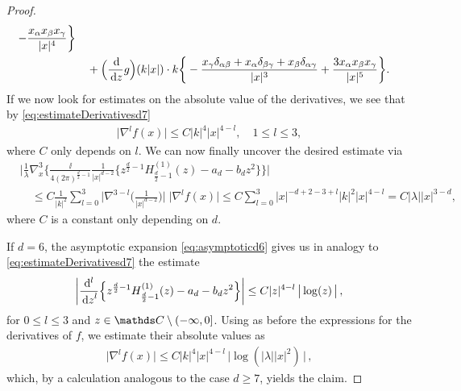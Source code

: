 \begin{proof}
\begin{align*}
  - \frac{x_\alpha x_\beta x_\gamma}{|x|^4} \bigg\} \\
  &\quad + \Big(\frac{\, {\operatorname{d}\!{}}}{\, {\operatorname{d}\!{z}}}g\Big)(k|x|) \cdot k \bigg\{-\frac{ x_\gamma\delta_{\alpha\beta} + x_\alpha \delta_{\beta\gamma} + x_\beta \delta_{\alpha\gamma}}{|x|^3} + \frac{3 x_\alpha x_\beta x_\gamma}{|x|^5} \bigg\}.
\end{align*}
If we now look for estimates on the absolute value of the derivatives, we see that by \eqref{eq:estimateDerivativesd7}
\begin{align*}
  \big|\nabla^l f(x)\big| \leq C |k|^4 |x|^{4 - l}, \quad 1 \leq l \leq 3,
\end{align*}
where $C$ only depends on $l$.
We can now finally uncover the desired estimate via
\begin{align*}
  &\bigg|\frac{1}{\lambda} \nabla_x^3 \bigg\{ \frac{\ii}{4 (2\pi)^{\frac{d}{2} - 1}} \frac{1}{|x|^{d - 2}} \Big\{ z^{\frac{d}{2} - 1} H_{\frac{d}{2} - 1}^{(1)}(z) - a_d - b_d z^2\Big\} \bigg\} \bigg| \\
  &\quad\leq C \frac{1}{|k|^2} \sum_{l = 0}^3 \Big| \nabla^{3 - l}\Big(\frac{1}{|x|^{d - 2}}\Big)\Big|\; \big| \nabla^l f(x) \big| 
  \leq C \sum_{l = 0}^3 |x|^{-d + 2 - 3 + l} |k|^2 |x|^{4 - l} = C |\lambda| |x|^{3 - d},
\end{align*}
where $C$ is a constant only depending on $d$.

If $d = 6$, the asymptotic expansion \eqref{eq:asymptoticd6} gives us 
in analogy to \eqref{eq:estimateDerivativesd7} the estimate
\begin{align}
  \label{eq:estimateDerivativesd6}
  \bigg| \frac{\mathrm{d}^l}{\, {\operatorname{d}\!{z}}^l} \Big\{ z^{\frac{d}{2} - 1} H_{\frac{d}{2} - 1}^{(1)}(z) - a_d - b_d z^2 \Big\} \bigg| \leq C |z|^{4 - l} \, \big| \log(z)\, \big|\, ,
\end{align}
for $0 \leq l \leq 3$ and $z \in \C \setminus (-\infty, 0]$.
Using as before the expressions for the derivatives of $f$, we estimate their absolute values as
\begin{align*}
  \big|\nabla^l f(x) \big| \leq C |k|^4 |x|^{4 - l}\, \big|\log(|\lambda| |x|^2)\, \big|\, , 
\end{align*}
which, by a calculation analogous to the case $d \geq 7$, yields the claim.


\end{proof}
